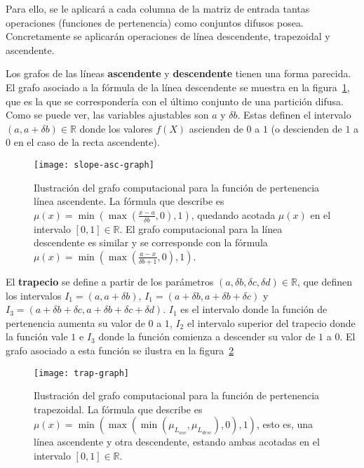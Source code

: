 Para ello, se le aplicará a cada columna de la matriz de entrada tantas operaciones (funciones de pertenencia) como conjuntos difusos posea. Concretamente se aplicarán operaciones de línea descendente, trapezoidal y ascendente.

Los grafos de las líneas \textbf{ascendente} y \textbf{descendente} tienen una forma parecida. El grafo asociado a la fórmula de la línea descendente se muestra en la figura~\ref{fig:slope-asc-grap}, que es la que se correspondería con el último conjunto de una partición difusa. Como se puede ver, las variables ajustables son $a$ y $\delta b$. Estas definen el intervalo $(a, a + \delta b) \in \mathbb{R}$ donde los valores $f(X)$ ascienden de $0$ a $1$ (o descienden de $1$ a $0$ en el caso de la recta ascendente).

\begin{figure}
	\centering
	\texttt{[image: slope-asc-graph]}
	\caption[Grafo computacional de la función de pertenencia para la línea ascendente]{Ilustración del grafo computacional para la función de pertenencia línea ascendente. La fórmula que describe es $\mu(x) = \min(\max(\frac{x - a}{\delta b}, 0), 1)$, quedando acotada $\mu(x)$ en el intervalo $[0, 1] \in \mathbb{R}$. El grafo computacional para la línea descendente es similar y se corresponde con la fórmula $\mu(x) = \min(\max(\frac{a - x}{\delta b + 1}, 0), 1)$.}
	\label{fig:slope-asc-grap}
\end{figure}

El \textbf{trapecio} se define a partir de los parámetros $(a, \delta b, \delta c, \delta d) \in \mathbb{R}$, que definen los intervalos $I_1 = (a, a + \delta b)$, $I_1 = (a + \delta b, a + \delta b + \delta c)$ y $I_3 = (a + \delta b + \delta c, a + \delta b + \delta c + \delta d)$. $I_1$ es el intervalo donde la función de pertenencia aumenta su valor de $0$ a $1$, $I_2$ el intervalo superior del trapecio donde la función vale $1$ e $I_3$ donde la función comienza a descender su valor de $1$ a $0$. El grafo asociado a esta función se ilustra en la figura~\ref{fig:trap-graph}

\begin{figure}
	\centering
	\texttt{[image: trap-graph]}
	\caption[Grafo computacional de la función de pertenencia para el trapecio]{Ilustración del grafo computacional para la función de pertenencia trapezoidal. La fórmula que describe es $\mu(x) = \min(\max(\min(\mu_{L_{asc}}, \mu_{L_{desc}}), 0), 1)$, esto es, una línea ascendente y otra descendente, estando ambas acotadas en el intervalo $[0, 1] \in \mathbb{R}$.}
	\label{fig:trap-graph}
\end{figure}

